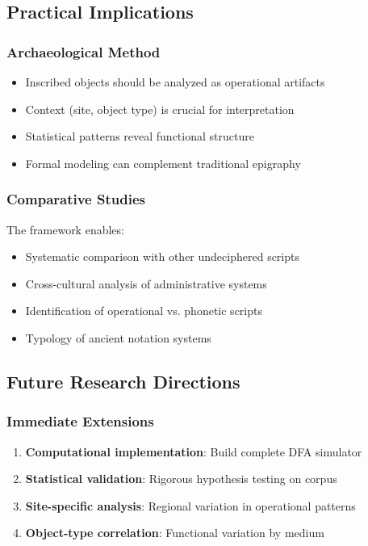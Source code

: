 \subsection{Practical Implications}

\subsubsection{Archaeological Method}
\begin{itemize}
    \item Inscribed objects should be analyzed as operational artifacts
    \item Context (site, object type) is crucial for interpretation
    \item Statistical patterns reveal functional structure
    \item Formal modeling can complement traditional epigraphy
\end{itemize}

\subsubsection{Comparative Studies}
The framework enables:
\begin{itemize}
    \item Systematic comparison with other undeciphered scripts
    \item Cross-cultural analysis of administrative systems
    \item Identification of operational vs. phonetic scripts
    \item Typology of ancient notation systems
\end{itemize}

\subsection{Future Research Directions}

\subsubsection{Immediate Extensions}
\begin{enumerate}
    \item \textbf{Computational implementation}: Build complete DFA simulator
    \item \textbf{Statistical validation}: Rigorous hypothesis testing on corpus
    \item \textbf{Site-specific analysis}: Regional variation in operational patterns
    \item \textbf{Object-type correlation}: Functional variation by medium
\end{enumerate}

